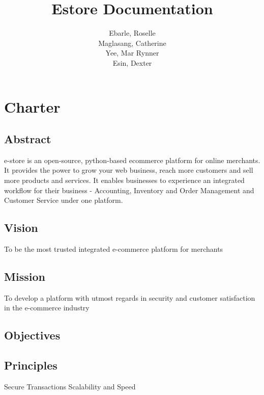 \documentclass{report}
\begin{document}
\title{\textbf{Estore Documentation} \\ 
}
\author{
\normalsize
Ebarle, Roselle \\
Maglasang, Catherine \\
Yee, Mar Rynner \\
Esin, Dexter \\
}


\maketitle
\tableofcontents
\newpage
{}

\chapter{Charter}
\section{Abstract}
e-store is an open-source, python-based ecommerce platform for online merchants. It provides the power to grow your web business, reach more customers and sell more products and services. It enables businesses to experience an integrated workflow for their business - Accounting, Inventory and Order Management and Customer Service under one platform. 

\section{Vision}
To be the most trusted integrated e-commerce platform for merchants

\section{Mission}
To develop a platform with utmost regards in security and customer satisfaction in the e-commerce industry

\section{Objectives}

\section{Principles}
Secure Transactions
Scalability and Speed
\end{document}
